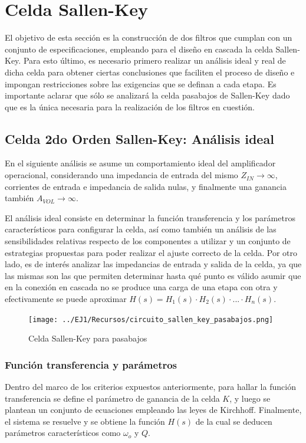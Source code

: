 \section{Celda Sallen-Key}
El objetivo de esta secci\'on es la construcci\'on de dos filtros que cumplan con un conjunto de especificaciones,
empleando para el dise\~no en cascada la celda Sallen-Key. Para esto \'ultimo, es necesario primero realizar un an\'alisis ideal
y real de dicha celda para obtener ciertas conclusiones que faciliten el proceso de dise\~no e impongan restricciones sobre
las exigencias que se definan a cada etapa. Es importante aclarar que s\'olo se analizar\'a la celda pasabajos de Sallen-Key dado
que es la \'unica necesaria para la realizaci\'on de los filtros en cuesti\'on.

\subsection{Celda 2do Orden Sallen-Key: An\'alisis ideal}
En el siguiente an\'alisis se asume un comportamiento ideal del amplificador operacional, considerando una impedancia de entrada del mismo
$Z_{IN} \rightarrow \infty$, corrientes de entrada e impedancia de salida nulas, y finalmente una ganancia tambi\'en $A_{VOL} \rightarrow \infty$.

El an\'alisis ideal consiste en determinar la funci\'on transferencia y los par\'ametros caracter\'isticos para configurar la celda, as\'i como tambi\'en un an\'alisis de las sensibilidades relativas
respecto de los componentes a utilizar y un conjunto de estrategias propuestas para poder realizar el ajuste correcto de la celda. Por otro lado, es de inter\'es analizar las impedancias de entrada y salida de la celda,
ya que las mismas son las que permiten determinar hasta qu\'e punto es v\'alido asumir que en la conexi\'on en cascada no se produce una carga de una etapa con otra y efectivamente se puede aproximar $H(s) = H_1(s) \cdot H_2(s) \cdot ... \cdot H_n(s)$.

\begin{figure}[H]
    \centering
    \texttt{[image: ../EJ1/Recursos/circuito\_sallen\_key\_pasabajos.png]}
    \caption{Celda Sallen-Key para pasabajos}
    \label{circuito_sallen_key_pasabajos}
\end{figure}

\subsubsection{Funci\'on transferencia y par\'ametros}
Dentro del marco de los criterios expuestos anteriormente, para hallar la funci\'on transferencia se define el par\'ametro de ganancia de la celda $K$, y luego
se plantean un conjunto de ecuaciones empleando las leyes de Kirchhoff. Finalmente, el sistema se resuelve y se obtiene la funci\'on $H(s)$ de la cual se deducen par\'ametros
caracter\'isticos como $\omega_o$ y $Q$.

